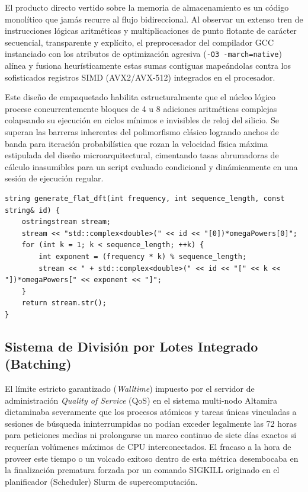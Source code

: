 \documentclass[12pt,a4paper]{tfg_domingo}
\begin{document}
El producto directo vertido sobre la memoria de almacenamiento es un código monolítico que jamás recurre al flujo bidireccional. Al observar un extenso tren de instrucciones lógicas aritméticas y multiplicaciones de punto flotante de carácter secuencial, transparente y explícito, el preprocesador del compilador GCC instanciado con los atributos de optimización agresiva (\texttt{-O3 -march=native}) alínea y fusiona heurísticamente estas sumas contiguas mapeándolas contra los sofisticados registros SIMD (AVX2/AVX-512) integrados en el procesador. 

Este diseño de empaquetado habilita estructuralmente que el núcleo lógico procese concurrentemente bloques de 4 u 8 adiciones aritméticas complejas colapsando su ejecución en ciclos mínimos e invisibles de reloj del silicio. Se superan las barreras inherentes del polimorfismo clásico logrando anchos de banda para iteración probabilística que rozan la velocidad física máxima estipulada del diseño microarquitectural, cimentando tasas abrumadoras de cálculo inasumibles para un script evaluado condicional y dinámicamente en una sesión de ejecución regular.

\begin{lstlisting}[caption={Rutina generadora algorítmica inyectando sentencias operacionales y sumatorias monolíticas directas en el archivo fuente de extensión C++ destino}, label={lst:unrolled_dft_gen}]
string generate_flat_dft(int frequency, int sequence_length, const string& id) {
    ostringstream stream;
    stream << "std::complex<double>(" << id << "[0])*omegaPowers[0]";
    for (int k = 1; k < sequence_length; ++k) {
        int exponent = (frequency * k) % sequence_length;
        stream << " + std::complex<double>(" << id << "[" << k << "])*omegaPowers[" << exponent << "]";
    }
    return stream.str();
}
\end{lstlisting}

\subsection{Sistema de División por Lotes Integrado (Batching)}
El límite estricto garantizado (\emph{Walltime}) impuesto por el servidor de administración \emph{Quality of Service} (QoS) en el sistema multi-nodo Altamira dictaminaba severamente que los procesos atómicos y tareas únicas vinculadas a sesiones de búsqueda ininterrumpidas no podían exceder legalmente las 72 horas para peticiones medias ni prolongarse un marco continuo de siete días exactos si requerían volúmenes máximos de CPU interconectados. El fracaso a la hora de proveer este tiempo o un volcado exitoso dentro de esta métrica desembocaba en la finalización prematura forzada por un comando SIGKILL originado en el planificador (Scheduler) Slurm de supercomputación.
\end{document}
